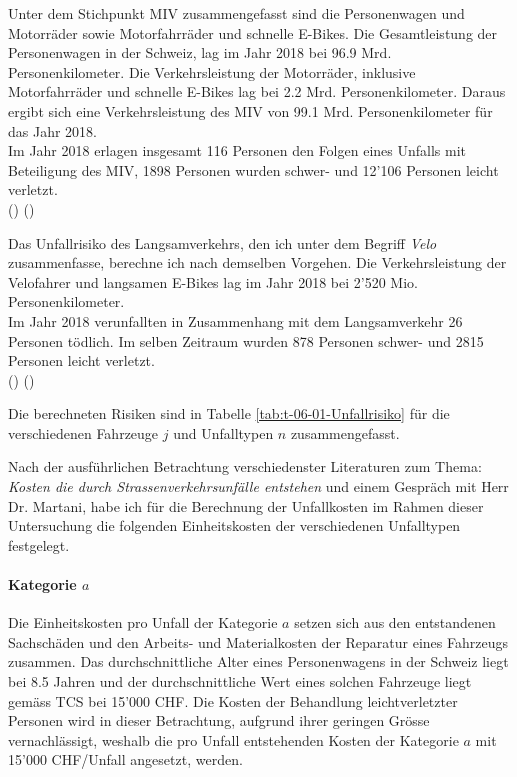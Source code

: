 Unter dem Stichpunkt MIV zusammengefasst sind die Personenwagen und Motorräder sowie Motorfahrräder und schnelle E-Bikes. Die Gesamtleistung der Personenwagen in der Schweiz, lag im Jahr 2018 bei 96.9 Mrd. Personenkilometer. Die Verkehrsleistung der Motorräder, inklusive Motorfahrräder und schnelle E-Bikes lag bei 2.2 Mrd. Personenkilometer. Daraus ergibt sich eine Verkehrsleistung des MIV von 99.1 Mrd. Personenkilometer für das Jahr 2018. \\
Im Jahr 2018 erlagen insgesamt 116 Personen den Folgen eines Unfalls mit Beteiligung des MIV, 1898 Personen wurden schwer- und 12'106 Personen leicht verletzt. \\ (\cite{Verkehrsleistung2019}) (\cite{Unfall2019}) 

Das Unfallrisiko des Langsamverkehrs, den ich unter dem Begriff \textit{Velo} zusammenfasse, berechne ich nach demselben Vorgehen.
Die Verkehrsleistung der Velofahrer und langsamen E-Bikes lag im Jahr 2018 bei 2'520 Mio. Personenkilometer. \\
Im Jahr 2018 verunfallten in Zusammenhang mit dem Langsamverkehr 26 Personen tödlich. Im selben Zeitraum wurden 878 Personen schwer- und 2815 Personen leicht verletzt. \\ (\cite{Verkehrsleistung2019}) (\cite{Unfall2019})

Die berechneten Risiken sind in Tabelle \ref{tab:t-06-01-Unfallrisiko} für die verschiedenen Fahrzeuge $j$ und Unfalltypen $n$ zusammengefasst.




Nach der ausführlichen Betrachtung verschiedenster Literaturen zum Thema: \textit{Kosten die durch Strassenverkehrsunfälle entstehen} und einem Gespräch mit Herr Dr. Martani, habe ich für die Berechnung der Unfallkosten im Rahmen dieser Untersuchung die folgenden Einheitskosten der verschiedenen Unfalltypen festgelegt.

\paragraph{Kategorie $a$} Die Einheitskosten pro Unfall der Kategorie $a$ setzen sich aus den entstandenen Sachschäden und den Arbeits- und Materialkosten der Reparatur eines Fahrzeugs zusammen. Das durchschnittliche Alter eines Personenwagens in der Schweiz liegt bei 8.5 Jahren und der durchschnittliche Wert eines solchen Fahrzeuge liegt gemäss TCS bei 15'000 CHF. Die Kosten der Behandlung leichtverletzter Personen wird in dieser Betrachtung, aufgrund ihrer geringen Grösse vernachlässigt, weshalb die pro Unfall entstehenden Kosten der Kategorie $a$ mit 15'000 CHF/Unfall angesetzt, werden.

